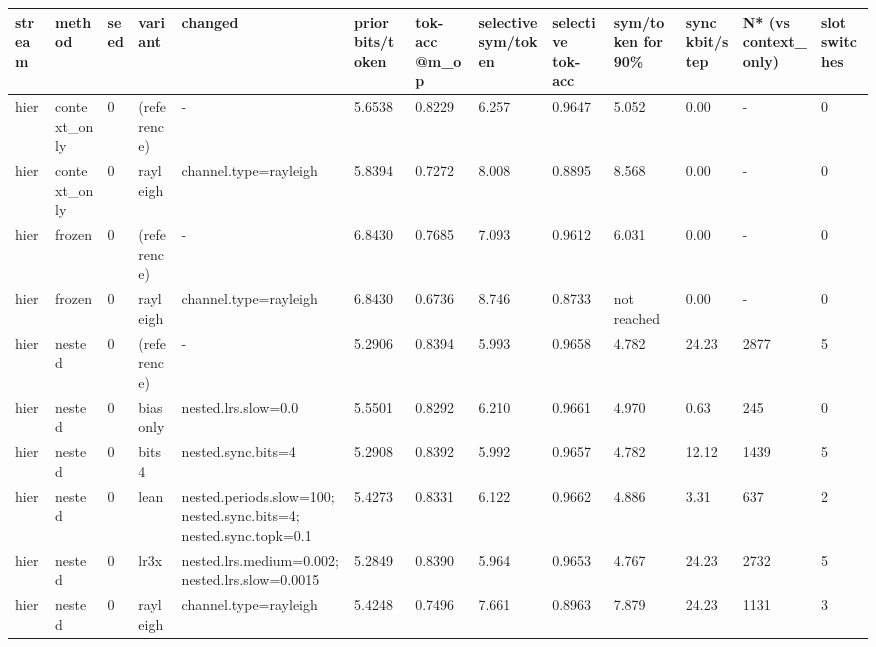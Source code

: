 \begin{tabular}{lllllllllllll}
\hline
stream & method & seed & variant & changed & prior bits/token & tok-acc @m\_op & selective sym/token & selective tok-acc & sym/token for 90\% & sync kbit/step & N* (vs context\_only) & slot switches \\
\hline
hier & context\_only & 0 & (reference) & - & 5.6538 & 0.8229 & 6.257 & 0.9647 & 5.052 & 0.00 & - & 0 \\
hier & context\_only & 0 & rayleigh & channel.type=rayleigh & 5.8394 & 0.7272 & 8.008 & 0.8895 & 8.568 & 0.00 & - & 0 \\
hier & frozen & 0 & (reference) & - & 6.8430 & 0.7685 & 7.093 & 0.9612 & 6.031 & 0.00 & - & 0 \\
hier & frozen & 0 & rayleigh & channel.type=rayleigh & 6.8430 & 0.6736 & 8.746 & 0.8733 & not reached & 0.00 & - & 0 \\
hier & nested & 0 & (reference) & - & 5.2906 & 0.8394 & 5.993 & 0.9658 & 4.782 & 24.23 & 2877 & 5 \\
hier & nested & 0 & biasonly & nested.lrs.slow=0.0 & 5.5501 & 0.8292 & 6.210 & 0.9661 & 4.970 & 0.63 & 245 & 0 \\
hier & nested & 0 & bits4 & nested.sync.bits=4 & 5.2908 & 0.8392 & 5.992 & 0.9657 & 4.782 & 12.12 & 1439 & 5 \\
hier & nested & 0 & lean & nested.periods.slow=100; nested.sync.bits=4; nested.sync.topk=0.1 & 5.4273 & 0.8331 & 6.122 & 0.9662 & 4.886 & 3.31 & 637 & 2 \\
hier & nested & 0 & lr3x & nested.lrs.medium=0.002; nested.lrs.slow=0.0015 & 5.2849 & 0.8390 & 5.964 & 0.9653 & 4.767 & 24.23 & 2732 & 5 \\
hier & nested & 0 & rayleigh & channel.type=rayleigh & 5.4248 & 0.7496 & 7.661 & 0.8963 & 7.879 & 24.23 & 1131 & 3 \\
\hline
\end{tabular}
